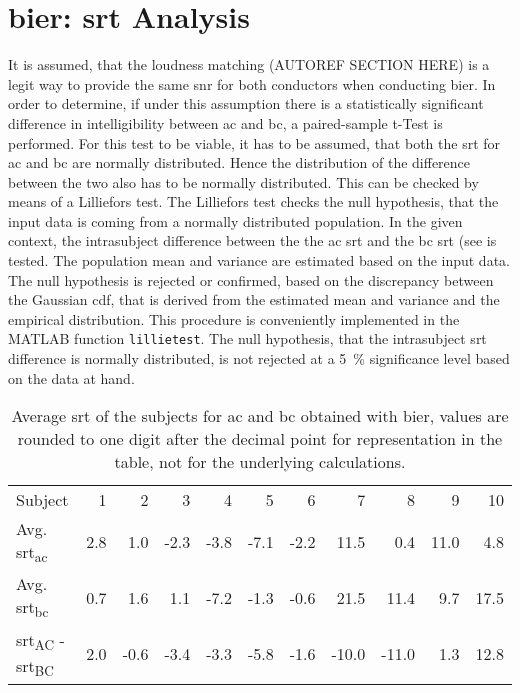\section{\gls{bier}: \gls{srt} Analysis}

It is assumed, that the loudness matching (AUTOREF SECTION HERE) is a legit way to provide the same \gls{snr} for both conductors when conducting \gls{bier}.
In order to determine, if under this assumption there is a statistically significant difference in intelligibility between \gls{ac} and \gls{bc}, a paired-sample t-Test is performed.
For this test to be viable, it has to be assumed, that both the \gls{srt} for \gls{ac} and \gls{bc} are normally distributed. Hence the distribution of the difference between the two also has to be normally distributed. 
This can be checked by means of a Lilliefors test.
The Lilliefors test checks the null hypothesis, that the input data is coming from a normally distributed population. 
In the given context, the intrasubject difference between the the \gls{ac} \gls{srt} and the \gls{bc} \gls{srt} (see  is tested.
The population mean and variance are estimated based on the input data. The null hypothesis is rejected or confirmed, based on the discrepancy between the Gaussian \gls{cdf}, that is derived from the estimated mean and variance and the empirical distribution.
This procedure is conveniently implemented in the MATLAB\textsuperscript{\textregistered} function \texttt{lillietest}.
The null hypothesis, that the intrasubject \gls{srt} difference is normally distributed, is not rejected at a \SI{5}{\percent} significance level based on the data at hand.


 
\begin{table}[H]
\centering
\caption{Average \gls{srt} of the subjects for \gls{ac} and \gls{bc} obtained with \gls{bier}, values are rounded to one digit after the decimal point for representation in the table, not for the underlying calculations.}
\label{tab:srt}
\begin{tabular}{lrrrrrrrrrr}
Subject     & 1   & 2    & 3    & 4    & 5    & 6    & 7     & 8     & 9    & 10   \\
Avg. \gls{srt}\textsubscript{\gls{ac}} & 2.8 & 1.0  & -2.3 & -3.8 & -7.1 & -2.2 & 11.5  & 0.4   & 11.0 & 4.8  \\
Avg. \gls{srt}\textsubscript{\gls{bc}} & 0.7 & 1.6  & 1.1  & -7.2 & -1.3 & -0.6 & 21.5  & 11.4  & 9.7  & 17.5 \\
\gls{srt}\textsubscript{AC} - \gls{srt}\textsubscript{BC}  & 2.0 & -0.6 & -3.4 & -3.3 & -5.8 & -1.6 & -10.0 & -11.0 & 1.3  & 12.8
\end{tabular}
\end{table}

